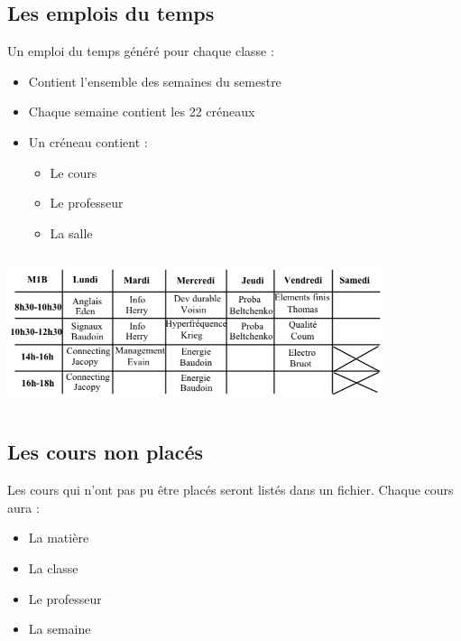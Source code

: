 \documentclass{beamer}
\begin{document}
\subsection{Les emplois du temps}
\begin {frame}
Un emploi du temps généré pour chaque classe : \\
\begin{itemize}
\item Contient l'ensemble des semaines du semestre
\item Chaque semaine contient les 22 créneaux
\item Un créneau contient : 
\begin {itemize}
\item Le cours
\item Le professeur
\item La salle
\end{itemize}
\end{itemize}
\end{frame}

\begin{frame}
\begin{center}
\includegraphics [width=110mm, height=45mm]{Dessin2.png}
\end{center}
\end{frame}

\subsection{Les cours non placés}
\begin{frame}
Les cours qui n'ont pas pu être placés seront listés dans un fichier.
Chaque cours aura : 
\begin{itemize}
\item La matière
\item La classe
\item Le professeur
\item La semaine
\end{itemize}
\end{frame}
\end{document}
